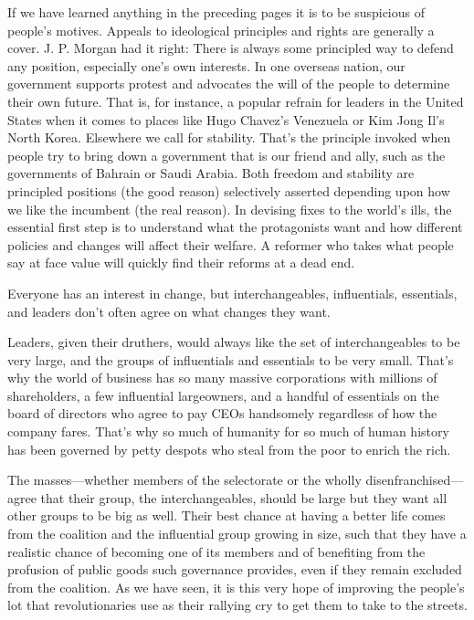 \documentclass[10pt]{article}
\begin{document}
{\large If we have learned anything in the preceding pages it is to be
suspicious of people's motives. Appeals to ideological principles and rights are
generally a cover. J. P. Morgan had it right: There is always some principled way
to defend any position, especially one's own interests. In one overseas nation,
our government supports protest and advocates the will of the people to determine
their own future. That is, for instance, a popular refrain for leaders in the
United States when it comes to places like Hugo Chavez's Venezuela or Kim Jong
Il's North Korea. Elsewhere we call for stability. That's the principle invoked
when people try to bring down a government that is our friend and ally, such as
the governments of Bahrain or Saudi Arabia. Both freedom and stability are
principled positions (the good reason) selectively asserted depending upon how we
like the incumbent (the real reason). In devising fixes to the world's ills, the
essential first step is to understand what the protagonists want and how
different policies and changes will affect their welfare. A reformer who takes
what people say at face value will quickly find their reforms at a dead end.}

{\large Everyone has an interest in change, but interchangeables, influentials,
essentials, and leaders don't often agree on what changes they want.}

{\large Leaders, given their druthers, would always like the set of
interchangeables to be very large, and the groups of influentials and essentials
to be very small. That's why the world of business has so many massive
corporations with millions of shareholders, a few influential largeowners, and a
handful of essentials on the board of directors who agree to pay CEOs handsomely
regardless of how the company fares. That's why so much of humanity for so much
of human history has been governed by petty despots who steal from the poor to
enrich the rich.}

{\large The masses---whether members of the selectorate or the wholly
disenfranchised---agree that their group, the interchangeables, should be large
but they want all other groups to be big as well. Their best chance at having a
better life comes from the coalition and the influential group growing in size,
such that they have a realistic chance of becoming one of its members and of
benefiting from the profusion of public goods such governance provides, even if
they remain excluded from the coalition. As we have seen, it is this very hope of
improving the people's lot that revolutionaries use as their rallying cry to get
them to take to the streets.}
\end{document}
